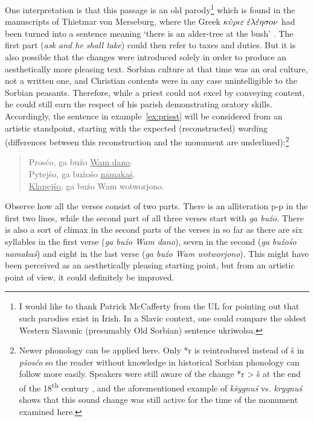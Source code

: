 \documentclass[output=paper,hidelinks]{langscibook}
\begin{document}
 
One interpretation is that this passage is an old parody\footnote{I
    would like to thank Patrick McCafferty from the UL for pointing out that such parodies exist in Irish. In a Slavic context, one could compare the oldest Western Slavonic (presumably Old Sorbian) sentence ukriwolsa.
    }
which is found in the manuscripts of Thietmar von Merseburg, where the Greek $\kappa\acute{\upsilon}\rho \iota \varepsilon \hspace*{0.1cm} \acute{\varepsilon} \lambda \acute{\varepsilon}\eta \sigma o\nu $ had been turned into a sentence meaning `there is an alder-tree at the bush’ \citep[27]{Stone2015}. The first part (\textit{ask and he shall take}) could then refer to taxes and duties. But it is also possible that the changes were introduced solely in order to produce an aesthetically more pleasing text. Sorbian culture at that time was an oral culture, not a written one, and Christian contents were in any case unintelligible to the Sorbian peasants. Therefore, while a priest could not excel by conveying content, he could still earn the respect of his parish demonstrating oratory skills. Accordingly, the sentence in example~\ref{ex:priest} will be considered from an artistic standpoint, starting with the expected (reconstructed) wording (differences between this reconstruction and the monument are underlined):\footnote{Newer phonology can be applied here. Only *r is reintroduced instead of š in \textit{pšosćo} so the reader without knowledge in historical Sorbian phonology can follow more easily. Speakers were still aware of the change *r > š at the end of the 18\textsuperscript{th} century \citep[31]{Schlegel2019}, and the aforementioned example of \textit{kšygnuś} vs. \textit{krygnuś} shows that this sound change was still active for the time of the monument examined here.}

\ea
\begin{quote}
    Prosćo, ga buźo \uline{Wam dano}.\\
    Pytejśo, ga buźośo \uline{namakaś}.\\
\uline{Klapejśo}, ga buźo Wam wotworjono.\\
\end{quote}
\label{ex:priest}
\z
 
Observe how all the verses consist of two parts. There is an alliteration p-p in the first two lines, while the second part of all three verses start with \textit{ga buźo.} There is also a sort of climax in the second parts of the verses in so far as there are six syllables in the first verse (\textit{ga buźo Wam dano}), seven in the second (\textit{ga buźośo namakaś}) and eight in the last verse (\textit{ga buźo Wam wotworjono}). This might have been perceived as an aesthetically pleasing starting point, but from an artistic point of view, it could definitely be improved.
 
\end{document}
